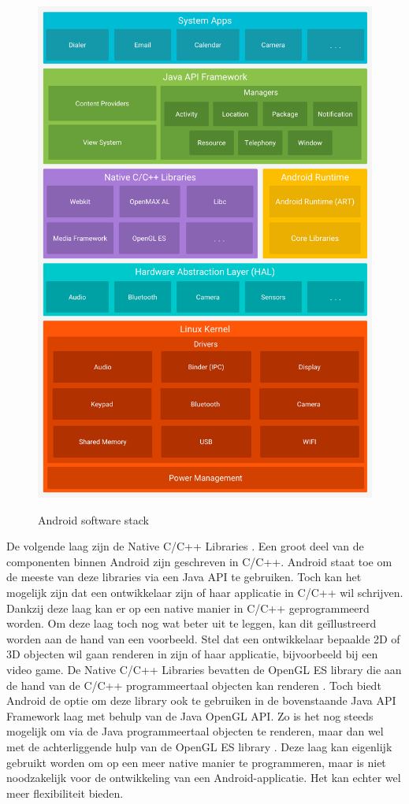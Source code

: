 \begin{figure}
  \centering
  \includegraphics[width=0.9\linewidth]{img/android}
  \caption{Android software stack}
  \label{fig:Android software stack} \autocite{Bron7IMG}
\end{figure}

De volgende laag zijn de Native C/C++ Libraries \autocite{Bron7, Bron13}. Een groot deel van de componenten binnen Android zijn geschreven in C/C++. Android staat toe om de meeste van deze libraries via een Java API te gebruiken. Toch kan het mogelijk zijn dat een ontwikkelaar zijn of haar applicatie in C/C++ wil schrijven. Dankzij deze laag kan er op een native manier in C/C++ geprogrammeerd worden. Om deze laag toch nog wat beter uit te leggen, kan dit geïllustreerd worden aan de hand van een voorbeeld. Stel dat een ontwikkelaar bepaalde 2D of 3D objecten wil gaan renderen in zijn of haar applicatie, bijvoorbeeld bij een video game. De Native C/C++ Libraries bevatten de OpenGL ES library die aan de hand van de C/C++ programmeertaal objecten kan renderen \autocite{Bron7, Bron13}. Toch biedt Android de optie om deze library ook te gebruiken in de bovenstaande Java API Framework laag met behulp van de Java OpenGL API. Zo is het nog steeds mogelijk om via de Java programmeertaal objecten te renderen, maar dan wel met de achterliggende hulp van de OpenGL ES library \autocite{Bron7}. Deze laag kan eigenlijk gebruikt worden om op een meer native manier te programmeren, maar is niet noodzakelijk voor de ontwikkeling van een Android-applicatie. Het kan echter wel meer flexibiliteit bieden.

